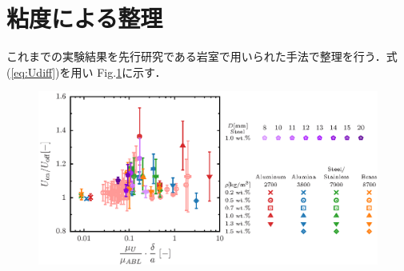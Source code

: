 \section{粘度による整理}

これまでの実験結果を先行研究である岩室\cite{ref:8}で用いられた手法で整理を行う．式(\ref{eq:Udiff})を用い
Fig.\ref{fig:viscosity_ratio}に示す．

\begin{figure}[ht]
    \centering
    \includegraphics[width=1.0\textwidth]{5-Results/viscosity.eps}
    \caption{}
    \label{fig:viscosity_ratio}
\end{figure}
